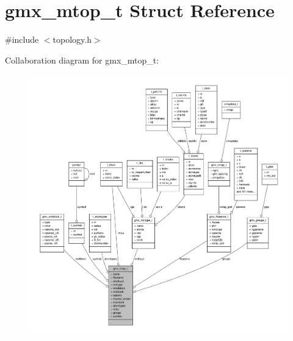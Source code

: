 \hypertarget{structgmx__mtop__t}{\section{gmx\-\_\-mtop\-\_\-t \-Struct \-Reference}
\label{structgmx__mtop__t}
}


{\ttfamily \#include $<$topology.\-h$>$}



\-Collaboration diagram for gmx\-\_\-mtop\-\_\-t\-:
\nopagebreak
\begin{figure}[H]
\begin{center}
\leavevmode
\includegraphics[width=350pt]{structgmx__mtop__t__coll__graph}
\end{center}
\end{figure}
